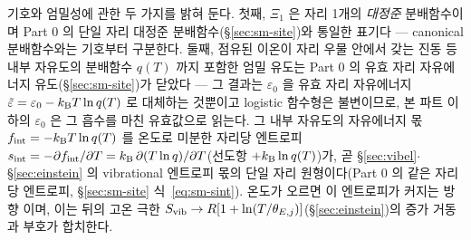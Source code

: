 기호와 엄밀성에 관한 두 가지를 밝혀 둔다. 첫째, $\Xi_1$ 은 자리 1개의 \emph{대정준} 분배함수이며
Part 0 의 단일 자리 대정준 분배함수(\S\ref{sec:sm-site})와 통일한 표기다 --- canonical 분배함수와는 기호부터 구분한다.
둘째, 점유된 이온이 자리 우물 안에서 갖는 진동 등 내부 자유도의 분배함수 $q(T)$ 까지 포함한 엄밀 유도는
Part 0 의 유효 자리 자유에너지 유도(\S\ref{sec:sm-site})가 닫았다 --- 그 결과는 $\varepsilon_0$ 을 유효 자리 자유에너지
$\tilde\varepsilon=\varepsilon_0-k_{\mathrm B} T\ln q(T)$ 로 대체하는 것뿐이고 logistic 함수형은 불변이므로, 본 파트 이하의
$\varepsilon_0$ 은 그 흡수를 마친 유효값으로 읽는다. 그 내부 자유도의 자유에너지 몫 $f_\mathrm{int}=-k_{\mathrm B} T\ln
q(T)$ 를 온도로 미분한 자리당 엔트로피 $s_\mathrm{int}=-\partial f_\mathrm{int}/\partial T=k_{\mathrm B}\,\partial(T\ln
q)/\partial T$(선도항 $+k_{\mathrm B}\ln q(T)$)가, 곧 \S\ref{sec:vibel}$\cdot$\S\ref{sec:einstein} 의 vibrational 엔트로피
몫의 단일 자리 원형이다(Part 0 의 같은 자리당 엔트로피, \S\ref{sec:sm-site} 식~\eqref{eq:sm-sint}). 온도가 오르면 이 엔트로피가 커지는 방향
이며, 이는 뒤의 고온 극한 $S_{\mathrm{vib}}\to R[1+\ln(T/\theta_{E,j})]$(\S\ref{sec:einstein})의 증가 거동과 부호가
합치한다.

